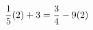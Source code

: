 \documentclass[preview]{standalone}
\begin{document}
\begin{align*}
\special{dvisvgm:raw <g id='unique000'>}\frac{1}{5}(2) + 3 = \frac{3}{4} - 9(2)\special{dvisvgm:raw </g>}
\end{align*}
\end{document}
